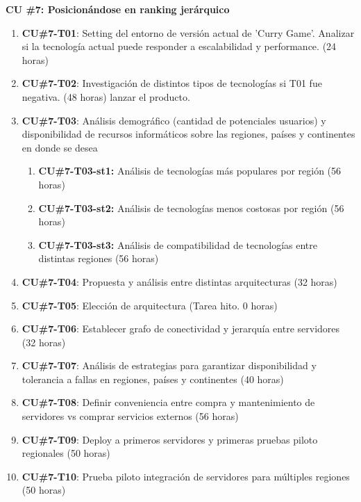 \textbf{CU \#7: Posicionándose en ranking jerárquico}
\begin{enumerate}
  \item \textbf{CU\#7-T01}: Setting del entorno de versión actual de 'Curry Game'. Analizar si la tecnología actual puede responder a escalabilidad y performance. (24 horas)
  \item \textbf{CU\#7-T02}: Investigación de distintos tipos de tecnologías si T01 fue negativa. (48 horas)
  lanzar el producto.
  \item \textbf{CU\#7-T03}: Análisis demográfico (cantidad de potenciales usuarios) y disponibilidad de recursos informáticos sobre las regiones, países y continentes en donde se desea
  \begin{enumerate}
    \item \textbf{\textbf{CU\#7-T03-st1}:} Análisis de tecnologías más populares por región (56 horas)
    \item \textbf{\textbf{CU\#7-T03-st2}:} Análisis de tecnologías menos costosas por región (56 horas)
    \item \textbf{\textbf{CU\#7-T03-st3}:} Análisis de compatibilidad de tecnologías entre distintas regiones (56 horas)
  \end{enumerate}
  \item \textbf{CU\#7-T04}: Propuesta y análisis entre distintas arquitecturas (32 horas)
  \item \textbf{CU\#7-T05}: Elección de arquitectura (Tarea hito. 0 horas)
  \item \textbf{CU\#7-T06}: Establecer grafo de conectividad y jerarquía entre servidores (32 horas)
  \item \textbf{CU\#7-T07}: Análisis de estrategias para garantizar disponibilidad y tolerancia a fallas en regiones, países y continentes (40 horas)
  \item \textbf{CU\#7-T08}: Definir conveniencia entre compra y mantenimiento de servidores vs comprar servicios externos (56 horas)
  \item \textbf{CU\#7-T09}: Deploy a primeros servidores y primeras pruebas piloto regionales (50 horas)
  \item \textbf{CU\#7-T10}: Prueba piloto integración de servidores para múltiples regiones (50 horas)
\end{enumerate}

